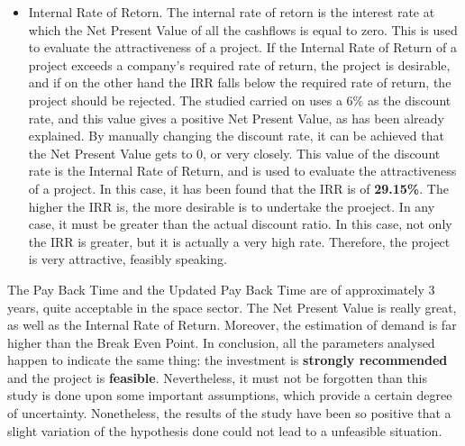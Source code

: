 \begin{itemize}
\item Internal Rate of Retorn. The internal rate of retorn is the interest rate at which the Net Present Value of all the cashflows is equal to zero. This is used to evaluate the attractiveness of a project. If the Internal Rate of Return of a project exceeds a company's required rate of return, the project is desirable, and if on the other hand the IRR falls below the required rate of return, the project should be rejected. The studied carried on uses a 6\% as the discount rate, and this value gives a positive Net Present Value, as has been already explained. By manually changing the discount rate, it can be achieved that the Net Present Value gets to 0, or very closely. This value of the discount rate is the Internal Rate of Return, and is used to evaluate the attractiveness of a project. In this case, it has been found that the IRR is of \textbf{29.15\%}. The higher the IRR is, the more desirable is to undertake the proeject. In any case, it must be greater than the actual discount ratio. In this case, not only the IRR is greater, but it is actually a very high rate. Therefore, the project is very attractive, feasibly speaking. 

\end{itemize}


The Pay Back Time and the Updated Pay Back Time are of approximately 3 years, quite acceptable in the space sector. The Net Present Value is really great, as well as the Internal Rate of Return. Moreover, the estimation of demand is far higher than the Break Even Point. In conclusion, all the parameters analysed happen to indicate the same thing: the investment is \textbf{strongly recommended} and the project is \textbf{feasible}. Nevertheless, it must not be forgotten than this study is done upon some important assumptions, which provide a certain degree of uncertainty. Nonetheless, the results of the study have been so positive that a slight variation of the hypothesis done could not lead to a unfeasible situation. 
